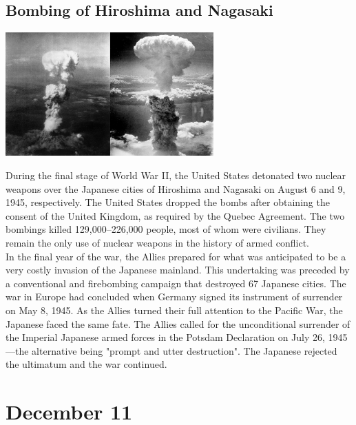 \documentclass[11pt]{report}
\begin{document}
\subsection{Bombing of Hiroshima and Nagasaki}
\vspace{2mm}\begin{center}\includegraphics[width=8cm]{./img/hiroNagabombing.jpg}\end{center}
During the final stage of World War II, the United States detonated two nuclear weapons over the Japanese cities of Hiroshima and Nagasaki on August 6 and 9, 1945, respectively. The United States dropped the bombs after obtaining the consent of the United Kingdom, as required by the Quebec Agreement. The two bombings killed 129,000–226,000 people, most of whom were civilians. They remain the only use of nuclear weapons in the history of armed conflict.\\
\indent In the final year of the war, the Allies prepared for what was anticipated to be a very costly invasion of the Japanese mainland. This undertaking was preceded by a conventional and firebombing campaign that destroyed 67 Japanese cities. The war in Europe had concluded when Germany signed its instrument of surrender on May 8, 1945. As the Allies turned their full attention to the Pacific War, the Japanese faced the same fate. The Allies called for the unconditional surrender of the Imperial Japanese armed forces in the Potsdam Declaration on July 26, 1945—the alternative being "prompt and utter destruction". The Japanese rejected the ultimatum and the war continued.
\section{December 11}
\end{document}
